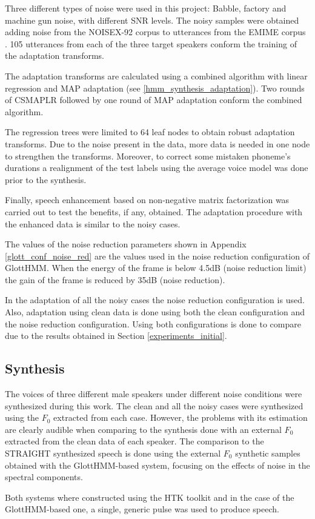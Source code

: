 Three different types of noise were used in this project: Babble, factory and machine gun noise, with different SNR levels.
%
The noisy samples were obtained adding noise from the NOISEX-92 corpus \cite{Varga1993247} to utterances from the EMIME corpus \cite{wester_accent2010}.
%
105 utterances from each of the three target speakers conform the training of the adaptation transforms.

The adaptation transforms are calculated using a combined algorithm with linear regression and MAP adaptation (see \ref{hmm_synthesis_adaptation}).
%
Two rounds of CSMAPLR followed by one round of MAP adaptation conform the combined algorithm.

The regression trees were limited to 64 leaf nodes to obtain robust adaptation transforms.
%
Due to the noise present in the data, more data is needed in one node to strengthen the transforms.
%
Moreover, to correct some mistaken phoneme's durations a realignment of the test labels using the average voice model was done prior to the synthesis.

Finally, speech enhancement based on non-negative matrix factorization \cite{raj_interspeech2010} was carried out to test the benefits, if any, obtained.
%
The adaptation procedure with the enhanced data is similar to the noisy cases.

The values of the noise reduction parameters shown in Appendix \ref{glott_conf_noise_red} are the values used in the noise reduction configuration of GlottHMM.
%
When the energy of the frame is below 4.5dB (noise reduction limit) the gain of the frame is reduced by 35dB (noise reduction).

In the adaptation of all the noisy cases the noise reduction configuration is used.
%
Also, adaptation using clean data is done using both the clean configuration and the noise reduction configuration.
%
Using both configurations is done to compare due to the results obtained in Section \ref{experiments_initial}.

\subsection{Synthesis}
\label{experiments_synthesis}
The voices of three different male speakers under different noise conditions were synthesized during this work.
%
The clean and all the noisy cases were synthesized using the $F_{0}$ extracted from each case.
%
However, the problems with its estimation are clearly audible when comparing to the synthesis done with an external $F_{0}$ extracted from the clean data of each speaker.
%
The comparison to the STRAIGHT synthesized speech is done using the external $F_{0}$ synthetic samples obtained with the GlottHMM-based system, focusing on the effects of noise in the spectral components.

Both systems where constructed using the HTK toolkit \cite{young1997htk} and in the case of the GlottHMM-based one, a single, generic pulse was used to produce speech.